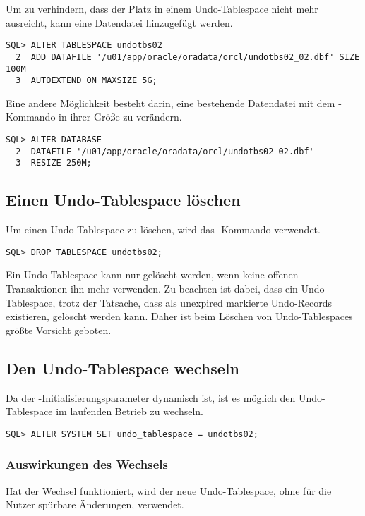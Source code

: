         Um zu verhindern, dass der Platz in einem Undo-Tablespace nicht mehr ausreicht, kann eine Datendatei hinzugefügt werden.
          \begin{lstlisting}[caption={Datendatei zum Undo-Tablespace hinzufügen},label=admin504,language=oracle_sql]
SQL> ALTER TABLESPACE undotbs02
  2  ADD DATAFILE '/u01/app/oracle/oradata/orcl/undotbs02_02.dbf' SIZE 100M
  3  AUTOEXTEND ON MAXSIZE 5G;
          \end{lstlisting}
          Eine andere Möglichkeit besteht darin, eine bestehende Datendatei mit dem -Kommando in ihrer Größe zu verändern.
          \begin{lstlisting}[caption={Datendatei in ihrer Größe verändern},label=admin505,language=oracle_sql]
SQL> ALTER DATABASE
  2  DATAFILE '/u01/app/oracle/oradata/orcl/undotbs02_02.dbf'
  3  RESIZE 250M;
          \end{lstlisting}
      \subsection{Einen Undo-Tablespace löschen}
        Um einen Undo-Tablespace zu löschen, wird das -Kommando verwendet.
        \begin{lstlisting}[caption={Undo-Tablespace löschen},label=admin506,language=oracle_sql]
SQL> DROP TABLESPACE undotbs02;
        \end{lstlisting}
        \begin{merke}
          Ein Undo-Tablespace kann nur gelöscht werden, wenn keine offenen Transaktionen ihn mehr verwenden. Zu beachten ist dabei, dass ein Undo-Tablespace, trotz der Tatsache, dass als unexpired markierte Undo-Records existieren, gelöscht werden kann. Daher ist beim Löschen von Undo-Tablespaces größte Vorsicht geboten.
        \end{merke}
      \subsection{Den Undo-Tablespace wechseln}
        Da der -Initialisierungsparameter dynamisch ist, ist es möglich den Undo-Tablespace im laufenden Betrieb zu wechseln.
        \begin{lstlisting}[caption={Undo-Tablespace wechseln},label=admin507,language=oracle_sql]
SQL> ALTER SYSTEM SET undo_tablespace = undotbs02;
        \end{lstlisting}
        \subsubsection{Auswirkungen des Wechsels}
          Hat der Wechsel funktioniert, wird der neue Undo-Tablespace, ohne für die Nutzer spürbare Änderungen, verwendet.

